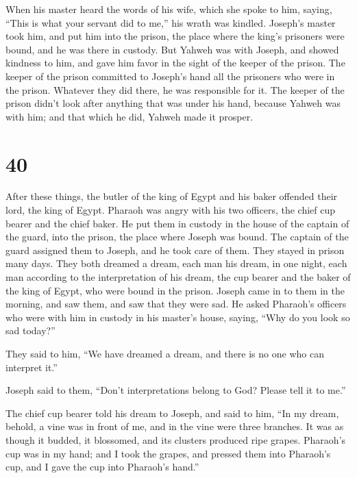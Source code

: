  When his master heard the words of his wife, which she
spoke to him, saying, ``This is what your servant did to me,'' his wrath
was kindled.  Joseph's master took him, and put him into
the prison, the place where the king's prisoners were bound, and he was
there in custody.  But Yahweh was with Joseph, and showed
kindness to him, and gave him favor in the sight of the keeper of the
prison.  The keeper of the prison committed to Joseph's
hand all the prisoners who were in the prison. Whatever they did there,
he was responsible for it.  The keeper of the prison didn't
look after anything that was under his hand, because Yahweh was with
him; and that which he did, Yahweh made it prosper.

\hypertarget{section-39}{%
\section{40}\label{section-39}}

 After these things, the butler of the king of Egypt and his
baker offended their lord, the king of Egypt.  Pharaoh was
angry with his two officers, the chief cup bearer and the chief baker.
 He put them in custody in the house of the captain of the
guard, into the prison, the place where Joseph was bound. 
The captain of the guard assigned them to Joseph, and he took care of
them. They stayed in prison many days.  They both dreamed a
dream, each man his dream, in one night, each man according to the
interpretation of his dream, the cup bearer and the baker of the king of
Egypt, who were bound in the prison.  Joseph came in to them
in the morning, and saw them, and saw that they were sad. 
He asked Pharaoh's officers who were with him in custody in his master's
house, saying, ``Why do you look so sad today?''

 They said to him, ``We have dreamed a dream, and there is
no one who can interpret it.''

Joseph said to them, ``Don't interpretations belong to God? Please tell
it to me.''

 The chief cup bearer told his dream to Joseph, and said to
him, ``In my dream, behold, a vine was in front of me,  and
in the vine were three branches. It was as though it budded, it
blossomed, and its clusters produced ripe grapes. 
Pharaoh's cup was in my hand; and I took the grapes, and pressed them
into Pharaoh's cup, and I gave the cup into Pharaoh's hand.''

